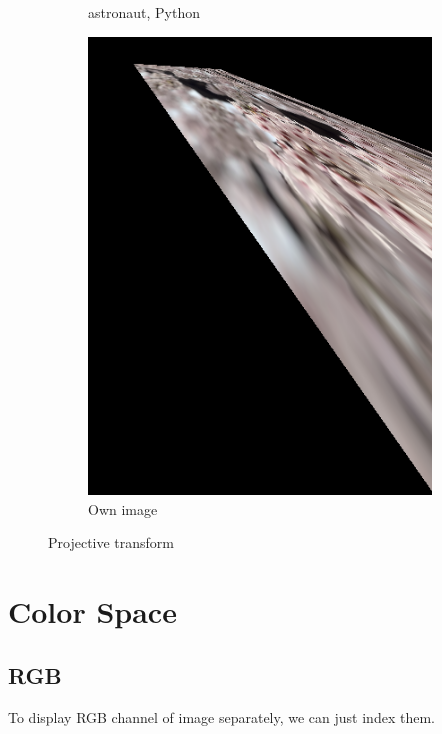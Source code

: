\documentclass{article}
\begin{document}
\begin{figure}[!ht]
\begin{subfigure}{0.267\textwidth}
        \caption{astronaut, Python}
    \end{subfigure}
    \begin{subfigure}{0.2\textwidth}
        \includegraphics[width=\textwidth]{./fig/projective_cb.png}
        \caption{Own image}
    \end{subfigure}
    \caption{Projective transform}
\end{figure}

\newpage
\section{Color Space}
\subsection{RGB}
To display RGB channel of image separately, we can just index them.
\end{document}
